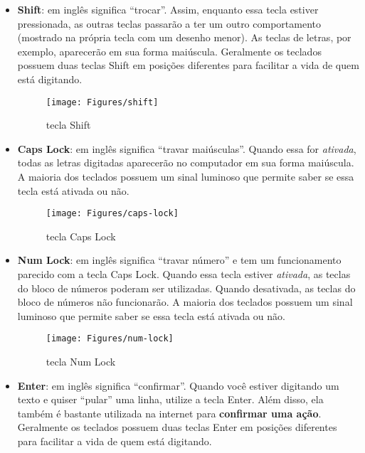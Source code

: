 \documentclass[hidelinks,12pt]{article}
\begin{document}
\begin{itemize}
    
	\item { \textbf{Shift}: em inglês significa ``trocar''. Assim, enquanto essa tecla estiver pressionada, as outras teclas passarão a ter um outro comportamento (mostrado na própria tecla com um desenho menor). As teclas de letras, por exemplo, aparecerão em sua forma maiúscula. Geralmente os teclados possuem duas teclas Shift em posições diferentes para facilitar a vida de quem está digitando. 
	 
	 \begin{figure}[!h]
	    \centering
		\texttt{[image: Figures/shift]}
		\label{fig:shift}
		\caption{tecla Shift}
	\end{figure}
	}
	
	\item{ \textbf{Caps Lock}: em inglês significa ``travar maiúsculas''. Quando essa for \emph{ativada}, todas as letras digitadas aparecerão no computador em sua forma maiúscula. A maioria dos teclados possuem um sinal luminoso que permite saber se essa tecla está ativada ou não.
	
    \begin{figure}[!h]
	    \centering
		\texttt{[image: Figures/caps-lock]}
		\label{fig:caps-lock}
		\caption{tecla Caps Lock}
	\end{figure}
    }
    
    \item { \textbf{Num Lock}: em inglês significa ``travar número'' e tem um funcionamento parecido com a tecla Caps Lock. Quando essa tecla estiver \emph{ativada}, as teclas do bloco de números poderam ser utilizadas. Quando desativada, as teclas do bloco de números não funcionarão. A maioria dos teclados possuem um sinal luminoso que permite saber se essa tecla está ativada ou não.

    \begin{figure}[!h]
	    \centering
		\texttt{[image: Figures/num-lock]}
		\label{fig:num-lock}
		\caption{tecla Num Lock}
	\end{figure}
	}
	
	\item { \textbf{Enter}: em inglês significa ``confirmar''. Quando você estiver digitando um texto e quiser ``pular'' uma linha, utilize a tecla Enter. Além disso, ela também é bastante utilizada na internet para \textbf{confirmar uma ação}. Geralmente os teclados possuem duas teclas Enter em posições diferentes para facilitar a vida de quem está digitando.
	
}
\end{itemize}
\end{document}
